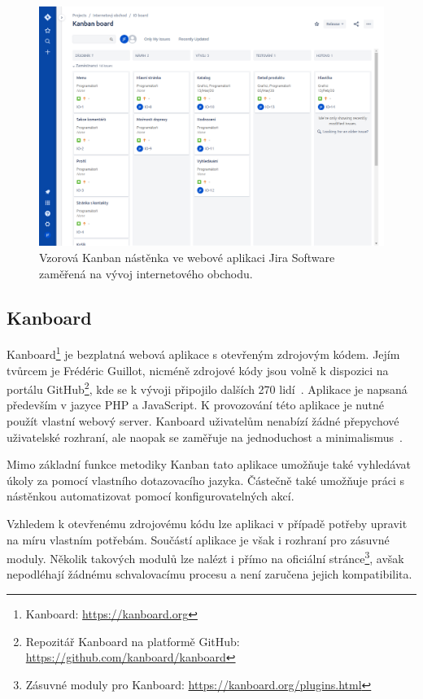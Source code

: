 \begin{figure}[H]
	\centering
	\includegraphics[width=\textwidth]{obrazky-figures/jira.png}
	\caption{Vzorová Kanban nástěnka ve webové aplikaci Jira Software zaměřená na vývoj internetového obchodu.}
\end{figure}

\subsection{Kanboard}
Kanboard\footnote{Kanboard: \url{https://kanboard.org}} je bezplatná webová aplikace s otevřeným zdrojovým kódem. Jejím tvůrcem je Frédéric Guillot, nicméně zdrojové kódy jsou volně k dispozici na portálu GitHub\footnote{Repozitář Kanboard na platformě GitHub: \url{https://github.com/kanboard/kanboard}}, kde se k vývoji připojilo dalších 270 lidí~\cite{bib:kanboard-github}. Aplikace je napsaná především v jazyce PHP a JavaScript. K provozování této aplikace je nutné použít vlastní webový server. Kanboard uživatelům nenabízí žádné přepychové uživatelské rozhraní, ale naopak se zaměřuje na jednoduchost a minimalismus~\cite{bib:kanboard}.

Mimo základní funkce metodiky Kanban tato aplikace umožňuje také vyhledávat úkoly za pomocí vlastního dotazovacího jazyka. Částečně také umožňuje práci s nástěnkou automatizovat pomocí konfigurovatelných akcí.

Vzhledem k otevřenému zdrojovému kódu lze aplikaci v případě potřeby upravit na míru vlastním potřebám. Součástí aplikace je však i rozhraní pro zásuvné moduly. Několik takových modulů lze nalézt i přímo na oficiální stránce\footnote{Zásuvné moduly pro Kanboard: \url{https://kanboard.org/plugins.html}}, avšak nepodléhají žádnému schvalovacímu procesu a není zaručena jejich kompatibilita.

